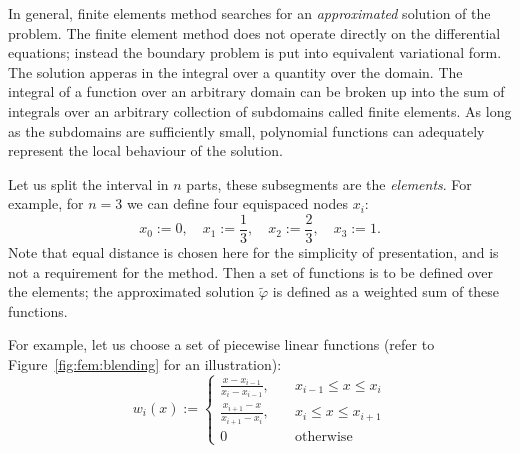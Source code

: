 \documentclass[notitlepage,oneside]{book}
\begin{document}
In general, finite elements method searches for an \textit{approximated} solution of the problem.
The finite element method does not operate directly on the differential equations; instead the boundary problem is put into equivalent variational form.
The solution apperas in the integral over a quantity over the domain. The integral of a function over an arbitrary domain can be broken up into the sum of integrals over an arbitrary collection 
of subdomains called finite elements. As long as the subdomains are sufficiently small, polynomial functions can adequately represent the local behaviour of the solution.

Let us split the interval in $n$ parts, these subsegments are the \textit{elements}.
For example, for $n=3$ we can define four equispaced nodes $x_i$:
$$
x_0 := 0, \quad x_1 := \frac{1}{3}, \quad x_2 := \frac{2}{3}, \quad x_3 := 1.
$$
Note that equal distance is chosen here for the simplicity of presentation, and is not a requirement for the method.
Then a set of functions is to be defined over the elements; the approximated solution $\tilde{\varphi}$ is defined as a weighted sum of these functions.

For example, let us choose a set of piecewise linear functions (refer to Figure~\ref{fig:fem:blending} for an illustration):
$$
w_i(x) := \left\{
\begin{split}
\frac{x-x_{i-1}}{x_i-x_{i-1}}, & \quad x_{i-1}\leq x \leq x_i \\
\frac{x_{i+1}-x}{x_{i+1}-x_i}, & \quad x_i\leq x \leq x_{i+1}\\
0 & \quad \text{otherwise}
\end{split}
\right.
$$
\end{document}
